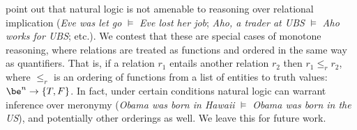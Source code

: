  point out that natural logic is
  not amenable to reasoning over relational implication
  (\textit{Eve was let go} $\models$ \textit{Eve lost her job};
   \textit{Aho, a trader at UBS} $\models$ \textit{Aho works for UBS};
   etc.).
We contest that these are special cases of monotone reasoning, where
  relations are treated as functions and ordered in the same way as
  quantifiers.
That is, if a relation $r_1$ entails another relation $r_2$ then
  $r_1 \leq_r r_2$, where $\leq_r$ is an ordering of functions from
  a list of entities to truth values: $\be^n \rightarrow \{T,F\}$.
In fact, under certain conditions natural logic can warrant inference
  over meronymy
  (\textit{Obama was born in Hawaii} $\models$ \textit{Obama was born in the US}),
  and potentially other orderings as well.
We leave this for future work.


